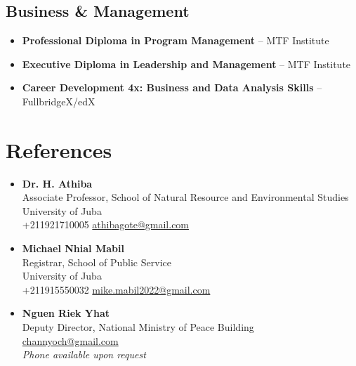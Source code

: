 \documentclass[a4paper,10pt]{article}
\begin{document}
\subsection{Business \& Management}
\begin{itemize}[noitemsep, leftmargin=*, topsep=0.2em]
    \item \textbf{Professional Diploma in Program Management} -- MTF Institute
    \item \textbf{Executive Diploma in Leadership and Management} -- MTF Institute
    \item \textbf{Career Development 4x: Business and Data Analysis Skills} -- FullbridgeX/edX
\end{itemize}

\section{References}
\begin{itemize}[noitemsep, leftmargin=*, label={}]
    \setlength{\itemsep}{0.5em}
    
    \item \textbf{Dr. H. Athiba} \\
          Associate Professor, School of Natural Resource and Environmental Studies \\
          University of Juba \\
           +211921710005 \hspace{1em} 
           \href{mailto:athibagote@gmail.com}{athibagote@gmail.com}
    
    \item \textbf{Michael Nhial Mabil} \\
          Registrar, School of Public Service \\
          University of Juba \\
           +211915550032 \hspace{1em} 
           \href{mailto:mike.mabil2022@gmail.com}{mike.mabil2022@gmail.com}
    
    \item \textbf{Nguen Riek Yhat} \\
          Deputy Director, National Ministry of Peace Building \\
           \href{mailto:channyoch@gmail.com}{channyoch@gmail.com} \\
          \textit{Phone available upon request}
\end{itemize}
\end{document}
